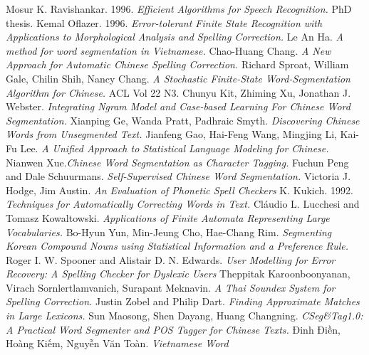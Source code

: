 \documentclass[a4paper,oneside]{book} %
\begin{document}
\begin{thebibliography}{}
Mosur K. Ravishankar. 1996. {\em Efficient Algorithms for
  Speech Recognition.} PhD thesis. %
Kemal Oflazer. 1996. {\em Error-tolerant Finite State
  Recognition with Applications to Morphological Analysis and Spelling
  Correction.} %
Le An Ha. {\em A method for word segmentation in
  Vietnamese.} %
Chao-Huang Chang. {\em A New Approach for
  Automatic Chinese Spelling Correction.} %
Richard Sproat, William Gale, Chilin Shih, Nancy
  Chang. {\em A Stochastic Finite-State Word-Segmentation Algorithm for
  Chinese.} ACL Vol 22 N3.%
Chunyu Kit, Zhiming Xu, Jonathan
  J. Webster. {\em Integrating Ngram Model and Case-based Learning For
  Chinese Word Segmentation.}%
Xianping Ge, Wanda Pratt,
  Padhraic Smyth. {\em Discovering Chinese Words from Unsegmented
  Text.}%
Jianfeng Gao, Hai-Feng Wang, Mingjing Li, Kai-Fu
  Lee. {\em A Unified Approach to Statistical Language Modeling for
  Chinese.}%
\bibitem{}Nianwen Xue.{\em Chinese Word Segmentation as Character
  Tagging.}%
Fuchun Peng and Dale Schuurmans. {\em Self-Supervised Chinese
  Word Segmentation.}%
Victoria J. Hodge, Jim Austin. {\em An Evaluation of
  Phonetic Spell Checkers}%
K. Kukich. 1992. {\em Techniques for Automatically Correcting
  Words in Text.}
\bibitem{}Cláudio L. Lucchesi and Tomasz Kowaltowski. {\em Applications of
  Finite Automata Representing Large Vocabularies.}%
\bibitem{}Bo-Hyun Yun, Min-Jeung Cho, Hae-Chang Rim. {\em Segmenting Korean
  Compound Nouns using Statistical Information and a Preference
  Rule. }%
\bibitem{}Roger I. W. Spooner and Alistair D. N. Edwards. {\em User
  Modelling for Error Recovery: A Spelling Checker for Dyslexic
  Users}%
\bibitem{}Theppitak Karoonboonyanan, Virach Sornlertlamvanich,
  Surapant Meknavin. {\em A Thai Soundex System for Spelling Correction.}%
\bibitem{}Justin Zobel and Philip Dart. {\em Finding Approximate Matches in
  Large Lexicons.}%
\bibitem{}Sun Maosong, Shen Dayang, Huang Changning. {\em CSeg\&Tag1.0: A
  Practical Word Segmenter and POS Tagger for Chinese Texts.}%
Đinh Điền, Hoàng Kiếm, Nguyễn Văn Toàn. {\em Vietnamese Word
}
\end{thebibliography}
\end{document}
